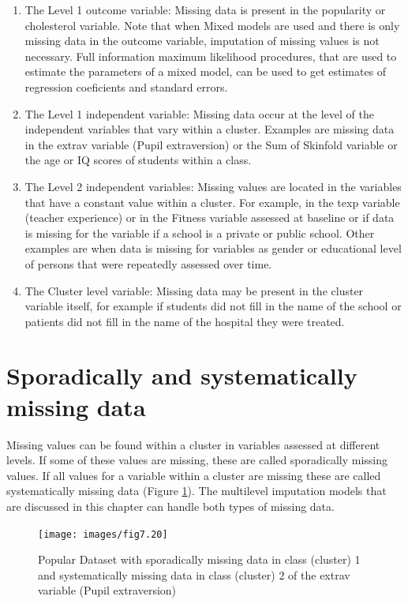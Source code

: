 \documentclass[
]{book}
\begin{document}
\begin{enumerate}
\def\labelenumi{\arabic{enumi})}
\item
  The Level 1 outcome variable:
  Missing data is present in the popularity or cholesterol variable. Note that when Mixed models are used and there is only missing data in the outcome variable, imputation of missing values is not necessary. Full information maximum likelihood procedures, that are used to estimate the parameters of a mixed model, can be used to get estimates of regression coeficients and standard errors.
\item
  The Level 1 independent variable:
  Missing data occur at the level of the independent variables that vary within a cluster. Examples are missing data in the extrav variable (Pupil extraversion) or the Sum of Skinfold variable or the age or IQ scores of students within a class.
\item
  The Level 2 independent variables:
  Missing values are located in the variables that have a constant value within a cluster. For example, in the texp variable (teacher experience) or in the Fitness variable assessed at baseline or if data is missing for the variable if a school is a private or public school. Other examples are when data is missing for variables as gender or educational level of persons that were repeatedly assessed over time.
\item
  The Cluster level variable:
  Missing data may be present in the cluster variable itself, for example if students did not fill in the name of the school or patients did not fill in the name of the hospital they were treated.
\end{enumerate}

\hypertarget{sporadically-and-systematically-missing-data}{%
\section{Sporadically and systematically missing data}\label{sporadically-and-systematically-missing-data}}

Missing values can be found within a cluster in variables assessed at different levels. If some of these values are missing, these are called sporadically missing values. If all values for a variable within a cluster are missing these are called systematically missing data (Figure \ref{fig:fig85}). The multilevel imputation models that are discussed in this chapter can handle both types of missing data.

\begin{figure}

{\centering \texttt{[image: images/fig7.20]} 

}

\caption{Popular Dataset with sporadically missing data in class (cluster) 1 and systematically missing data in class (cluster) 2 of the extrav variable (Pupil extraversion)}\label{fig:fig85}
\end{figure}
\end{document}
